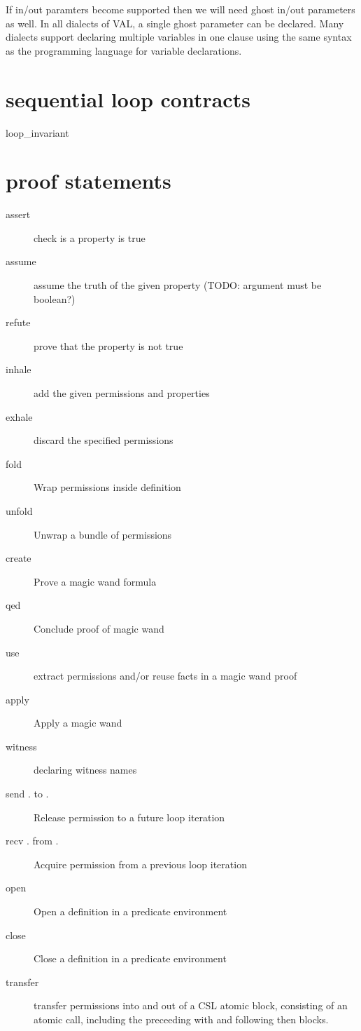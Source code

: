 If in/out paramters become supported then we will need ghost in/out parameters
as well. In all dialects of VAL, a single ghost parameter can be declared.
Many dialects support declaring multiple variables in one clause using
the same syntax as the programming language for variable declarations.

\section*{sequential loop contracts}

\begin{description}
\item[loop\_invariant]
\end{description}

\section*{proof statements}

\begin{description}
\item[assert] check is a property is true
\item[assume] assume the truth of the given property (TODO: argument must be boolean?)
\item[refute] prove that the property is not true
\item[inhale] add the given permissions and properties
\item[exhale] discard the specified permissions
\item[fold] Wrap permissions inside definition
\item[unfold] Unwrap a bundle of permissions
\item[create] Prove a magic wand formula
\item[qed] Conclude proof of magic wand
\item[use] extract permissions and/or reuse facts in a magic wand proof
\item[apply] Apply a magic wand
\item[witness] declaring witness names
\item[send . to .] Release permission to a future loop iteration
\item[recv . from .] Acquire permission from a previous loop iteration
\item[open] Open a definition in a predicate environment
\item[close] Close a definition in a predicate environment
\item[transfer] transfer permissions into and out of a CSL atomic block, consisting
of an atomic call, including the preceeding with and following then blocks.
\end{description}


